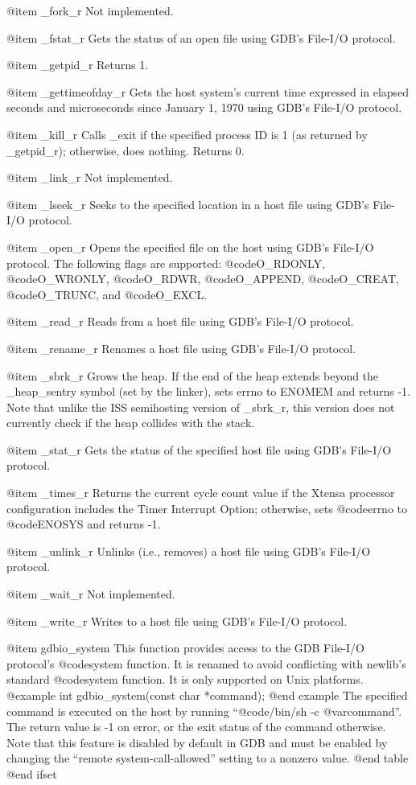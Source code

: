 @item _fork_r
Not implemented.

@item _fstat_r
Gets the status of an open file using GDB's File-I/O protocol.

@item _getpid_r
Returns 1.

@item _gettimeofday_r
Gets the host system's current time expressed in elapsed seconds and
microseconds since January 1, 1970 using GDB's File-I/O protocol.

@item _kill_r
Calls _exit if the specified process ID is 1 (as returned by _getpid_r);
otherwise, does nothing. Returns 0.

@item _link_r
Not implemented.

@item _lseek_r
Seeks to the specified location in a host file using GDB's File-I/O protocol.

@item _open_r
Opens the specified file on the host using GDB's File-I/O protocol.  The
following flags are supported: @code{O_RDONLY}, @code{O_WRONLY},
@code{O_RDWR}, @code{O_APPEND}, @code{O_CREAT}, @code{O_TRUNC}, and
@code{O_EXCL}.

@item _read_r
Reads from a host file using GDB's File-I/O protocol.

@item _rename_r
Renames a host file using GDB's File-I/O protocol.

@item _sbrk_r
Grows the heap. If the end of the heap extends beyond the _heap_sentry
symbol (set by the linker), sets errno to ENOMEM and returns -1.
Note that unlike the ISS semihosting version of _sbrk_r, this version
does not currently check if the heap collides with the stack.

@item _stat_r
Gets the status of the specified host file using GDB's File-I/O protocol.

@item _times_r
Returns the current cycle count value if the Xtensa processor
configuration includes the Timer Interrupt Option; otherwise, sets
@code{errno} to @code{ENOSYS} and returns -1.

@item _unlink_r
Unlinks (i.e., removes) a host file using GDB's File-I/O protocol.

@item _wait_r
Not implemented.

@item _write_r
Writes to a host file using GDB's File-I/O protocol.

@item gdbio_system
This function provides access to the GDB File-I/O protocol's @code{system}
function.  It is renamed to avoid conflicting with newlib's standard
@code{system} function.  It is only supported on Unix platforms.
@example
int gdbio_system(const char *command);
@end example
The specified command is executed on the host by running
``@code{/bin/sh -c @var{command}}''.  The return value is -1 on error, or
the exit status of the command otherwise.  Note that this feature is
disabled by default in GDB and must be enabled by changing the
``remote system-call-allowed'' setting to a nonzero value.
@end table
@end ifset


